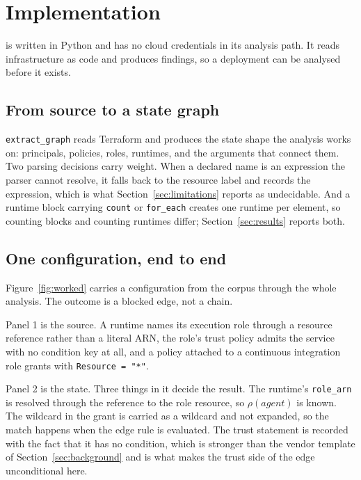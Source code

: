 \section{Implementation}
\label{sec:implementation}

\tool is written in Python and has no cloud credentials in its analysis path.
It reads infrastructure as code and produces findings, so a deployment can be
analysed before it exists.

\subsection{From source to a state graph}

\texttt{extract\_graph} reads Terraform and produces the state shape the
analysis works on: principals, policies, roles, runtimes, and the arguments
that connect them. Two parsing decisions carry weight. When a declared name is an expression the
parser cannot resolve, it falls back to the resource label and records the
expression, which is what Section~\ref{sec:limitations} reports as
undecidable. And a runtime block carrying \texttt{count} or
\texttt{for\_each} creates one runtime per element, so counting blocks and
counting runtimes differ; Section~\ref{sec:results} reports both.

\subsection{One configuration, end to end}

Figure~\ref{fig:worked} carries a configuration from the corpus through the
whole analysis. The outcome is a blocked edge, not a chain.



Panel 1 is the source. A runtime names its execution role through a resource
reference rather than a literal ARN, the role's trust policy admits the
service with no condition key at all, and a policy attached to a continuous
integration role grants  with \texttt{Resource = "*"}.

Panel 2 is the state. Three things in it decide the result. The runtime's
\texttt{role\_arn} is resolved through the reference to the role resource, so
$\rho(\mathit{agent})$ is known. The wildcard in the grant is carried as a
wildcard and not expanded, so the match happens when the edge rule is
evaluated. The trust statement is recorded with the fact that it has no
condition, which is stronger than the vendor template of
Section~\ref{sec:background} and is what makes the trust side of the edge
unconditional here.

